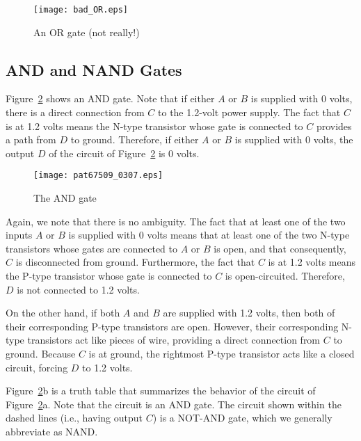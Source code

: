 \documentclass{patt}
\begin{document}
\begin{figure}
\centerline{\texttt{[image: bad\_OR.eps]}}
\caption{An OR gate (not really!)}\label{fig:bad_OR}
\vspace{-6pt}
\end{figure}

\FloatBarrier
\subsection{AND and NAND Gates}
Figure~\ref{fig:and} shows an AND gate.  Note that if either $A$ or $B$ is
supplied with 0 volts, there is a direct connection from $C$ to the
1.2-volt power supply.  The fact that $C$ is at 1.2 volts means the
N-type transistor whose gate is connected to $C$ provides a path from
$D$ to ground.  Therefore, if either $A$ or $B$ is supplied with 0
volts, the output $D$ of the circuit of Figure~\ref{fig:and} is 0 volts.

\begin{figure}
\centerline{\texttt{[image: pat67509\_0307.eps]}}
\caption{The AND gate}\label{fig:and}
\vspace{-6pt}
\end{figure}

\enlargethispage{-2\baselineskip}

Again, we note that there is no ambiguity.  The fact that at least one
of the two inputs $A$ or $B$ is supplied with 0 volts means that at
least one of the two N-type transistors whose gates are connected to
$A$ or $B$ is open, and that consequently, $C$ is disconnected from
ground.  Furthermore, the fact that $C$ is at 1.2 volts means the
P-type transistor whose gate is connected to $C$ is open-circuited.
Therefore, $D$ is not connected to 1.2 volts.

On the other hand, if both $A$ and $B$ are supplied with 1.2 volts,
then both of their corresponding P-type transistors are open.
However, their corresponding N-type transistors act like pieces of
wire, providing a direct connection from $C$ to ground.  Because $C$
is at ground, the rightmost P-type transistor acts like a closed
circuit, forcing $D$ to 1.2 volts.

Figure~\ref{fig:and}b is a truth table that summarizes the behavior of 
the circuit
of Figure~\ref{fig:and}a.  Note that the circuit is an AND gate.  The circuit
shown within the dashed lines (i.e., having output $C$) is a NOT-AND
gate, which we generally abbreviate as NAND.  
\end{document}
